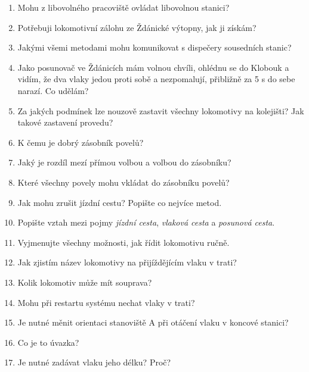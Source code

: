 \documentclass[12pt,a4paper]{article}
\begin{document}
\begin{enumerate}
	\item Mohu z libovolného pracoviště ovládat libovolnou stanici?
	
	\item Potřebuji lokomotivní zálohu ze Ždánické výtopny, jak ji získám?
	
	\item Jakými všemi metodami mohu komunikovat s dispečery sousedních stanic?
	
	\item Jako posunovač ve Ždánicích mám volnou chvíli, ohlédnu se do Klobouk a vidím, že dva vlaky jedou proti sobě a nezpomalují, přibližně za 5 s do sebe narazí. Co udělám?
	
	\item Za jakých podmínek lze nouzově zastavit všechny lokomotivy na kolejišti? Jak takové zastavení provedu?
	
	\item K čemu je dobrý zásobník povelů?
	
	\item Jaký je rozdíl mezí přímou volbou a volbou do zásobníku?
	
	\item Které všechny povely mohu vkládat do zásobníku povelů?
	
	\item Jak mohu zrušit jízdní cestu? Popište co nejvíce metod.
	
	\item Popište vztah mezi pojmy \textit{jízdní cesta}, \textit{vlaková cesta} a \textit{posunová cesta}.
	
	\item Vyjmenujte všechny možnosti, jak řídit lokomotivu ručně.
	
	\item Jak zjistím název lokomotivy na přijíždějícím vlaku v trati?
	
	\item Kolik lokomotiv může mít souprava?
	
	\item Mohu při restartu systému nechat vlaky v trati?
	
	\item Je nutné měnit orientaci stanoviště A při otáčení vlaku v koncové stanici?
	
	\item Co je to úvazka?
	
	\item Je nutné zadávat vlaku jeho délku? Proč?
	

\end{enumerate}
\end{document}
